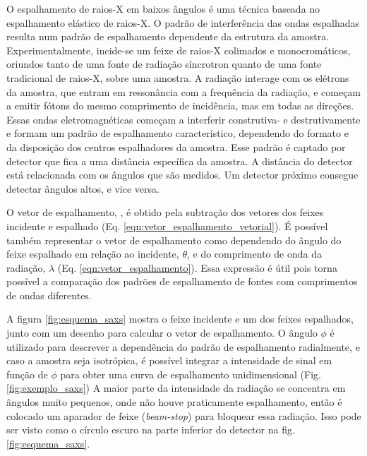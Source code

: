 				
		O espalhamento de raios-X em baixos ângulos é uma técnica baseada no espalhamento elástico de raios-X. O padrão de interferência das ondas espalhadas resulta num padrão de espalhamento dependente da estrutura da amostra. Experimentalmente, incide-se um feixe de raios-X colimados e monocromáticos, oriundos tanto de uma fonte de radiação síncrotron quanto de uma fonte tradicional de raios-X, sobre uma amostra. A radiação interage com os elétrons da amostra, que entram em ressonância com a frequência da radiação, e começam a emitir fótons do mesmo comprimento de incidência, mas em todas as direções. Essas ondas eletromagnéticas começam a interferir construtiva- e destrutivamente e formam um padrão de espalhamento característico, dependendo do formato e da disposição dos centros espalhadores da amostra. Esse padrão é captado por detector que fica a uma distância específica da amostra. A distância do detector está relacionada com os ângulos que são medidos. Um detector próximo consegue detectar ângulos altos, e vice versa.
		
		O vetor de espalhamento, \q, é obtido pela subtração dos vetores dos feixes incidente e espalhado (Eq. \ref{eqn:vetor_espalhamento_vetorial}). É possível também representar o vetor de espalhamento como dependendo do ângulo do feixe espalhado em relação ao incidente, \(\theta\), e do comprimento de onda da radiação, \(\lambda\) (Eq. \ref{eqn:vetor_espalhamento}). Essa expressão é útil pois torna possível a comparação dos padrões de espalhamento de fontes com comprimentos de ondas diferentes.
		
		
		A figura \ref{fig:esquema_saxs} mostra o feixe incidente e um dos feixes espalhados, junto com um desenho para calcular o vetor de espalhamento. O ângulo \(\phi\) é utilizado para descrever a dependência do padrão de espalhamento radialmente, e caso a amostra seja isotrópica, é possível integrar a intensidade de sinal em função de \(\phi\) para obter uma curva de espalhamento unidimensional (Fig. \ref{fig:exemplo_saxs}) A maior parte da intensidade da radiação se concentra em ângulos muito pequenos, onde não houve praticamente espalhamento, então é colocado um aparador de feixe (\emph{beam-stop}) para bloquear essa radiação. Isso pode ser visto como o círculo escuro na parte inferior do detector na fig. \ref{fig:esquema_saxs}.
			

